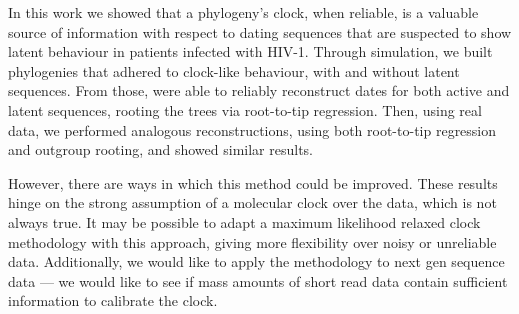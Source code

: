 \documentclass[12pt]{article}
\begin{document}






In this work we showed that a phylogeny's clock, when reliable, is a valuable source of information with respect to dating sequences that are suspected to show latent behaviour in patients infected with HIV-1. 
Through simulation, we built phylogenies that adhered to clock-like behaviour, with and without latent sequences.
From those, were able to reliably reconstruct dates for both active and latent sequences, rooting the trees via root-to-tip regression.
Then, using real data, we performed analogous reconstructions, using both root-to-tip regression and outgroup rooting, and showed similar results.

However, there are ways in which this method could be improved. 
These results hinge on the strong assumption of a molecular clock over the data, which is not always true. 
It may be possible to adapt a maximum likelihood relaxed clock methodology with this approach, giving more flexibility over noisy or unreliable data. 
Additionally, we would like to apply the methodology to next gen sequence data --- we would like to see if mass amounts of short read data contain sufficient information to calibrate the clock.
\end{document}

